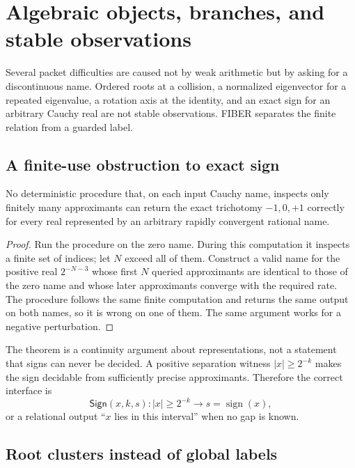 \section{Algebraic objects, branches, and stable observations}
\label{sec:algebra}

Several packet difficulties are caused not by weak arithmetic but by asking
for a discontinuous name.  Ordered roots at a collision, a normalized
eigenvector for a repeated eigenvalue, a rotation axis at the identity, and an
exact sign for an arbitrary Cauchy real are not stable observations.  FIBER
separates the finite relation from a guarded label.

\subsection{A finite-use obstruction to exact sign}

\begin{theorem}
\label{thm:no-sign}
No deterministic procedure that, on each input Cauchy name, inspects only
finitely many approximants can return the exact trichotomy
\(-1,0,+1\) correctly for every real represented by an arbitrary rapidly
convergent rational name.
\end{theorem}

\begin{proof}
Run the procedure on the zero name.  During this computation it inspects a
finite set of indices; let \(N\) exceed all of them.  Construct a valid name
for the positive real \(2^{-N-3}\) whose first \(N\) queried approximants are
identical to those of the zero name and whose later approximants converge with
the required rate.  The procedure follows the same finite computation and
returns the same output on both names, so it is wrong on one of them.  The same
argument works for a negative perturbation.
\end{proof}

The theorem is a continuity argument about representations, not a statement
that signs can never be decided.  A positive separation witness
\(|x|\ge2^{-k}\) makes the sign decidable from sufficiently precise
approximants.  Therefore the correct interface is
\[
  \mathsf{Sign}(x,k,s):
  |x|\ge2^{-k}\longrightarrow s=\operatorname{sign}(x),
\]
or a relational output ``\(x\) lies in this interval'' when no gap is known.

\subsection{Root clusters instead of global labels}


